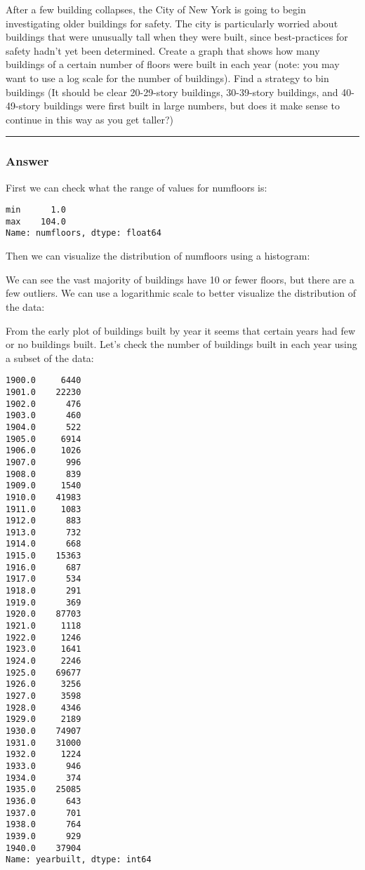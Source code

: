 \documentclass[11pt]{article}
\begin{document}
After a few building collapses, the City of New York is going to begin
investigating older buildings for safety. The city is particularly
worried about buildings that were unusually tall when they were built,
since best-practices for safety hadn't yet been determined. Create a
graph that shows how many buildings of a certain number of floors were
built in each year (note: you may want to use a log scale for the number
of buildings). Find a strategy to bin buildings (It should be clear
20-29-story buildings, 30-39-story buildings, and 40-49-story buildings
were first built in large numbers, but does it make sense to continue in
this way as you get taller?)

\begin{center}\rule{0.5\linewidth}{0.5pt}\end{center}

\hypertarget{answer}{%
\subsubsection{Answer}\label{answer}}

First we can check what the range of values for numfloors is:

    \begin{Verbatim}[commandchars=\\\{\}]
min      1.0
max    104.0
Name: numfloors, dtype: float64
    \end{Verbatim}

    Then we can visualize the distribution of numfloors using a histogram:

    
    
    We can see the vast majority of buildings have 10 or fewer floors, but
there are a few outliers. We can use a logarithmic scale to better
visualize the distribution of the data:

    
    
    From the early plot of buildings built by year it seems that certain
years had few or no buildings built. Let's check the number of buildings
built in each year using a subset of the data:

    \begin{Verbatim}[commandchars=\\\{\}]
1900.0     6440
1901.0    22230
1902.0      476
1903.0      460
1904.0      522
1905.0     6914
1906.0     1026
1907.0      996
1908.0      839
1909.0     1540
1910.0    41983
1911.0     1083
1912.0      883
1913.0      732
1914.0      668
1915.0    15363
1916.0      687
1917.0      534
1918.0      291
1919.0      369
1920.0    87703
1921.0     1118
1922.0     1246
1923.0     1641
1924.0     2246
1925.0    69677
1926.0     3256
1927.0     3598
1928.0     4346
1929.0     2189
1930.0    74907
1931.0    31000
1932.0     1224
1933.0      946
1934.0      374
1935.0    25085
1936.0      643
1937.0      701
1938.0      764
1939.0      929
1940.0    37904
Name: yearbuilt, dtype: int64
    \end{Verbatim}
\end{document}
